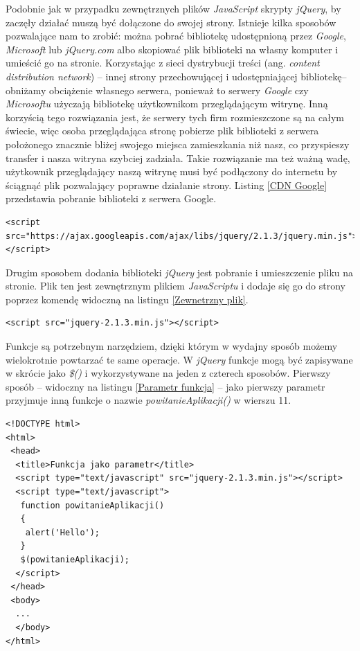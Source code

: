 \documentclass{iiuwb}
\begin{document}
Podobnie jak w przypadku zewnętrznych plików \textit{JavaScript} skrypty \textit{jQuery}, by zaczęły działać muszą być dołączone do swojej strony. Istnieje kilka sposobów pozwalające nam to zrobić: można pobrać bibliotekę udostępnioną przez \textit{Google}, \textit{Microsoft} lub \textit{jQuery.com} albo skopiować plik biblioteki na własny komputer i umieścić go na stronie.
Korzystając z sieci dystrybucji treści (ang. \textit{content distribution network}) -- innej strony przechowującej i udostępniającej bibliotekę--obniżamy obciążenie własnego serwera, ponieważ to serwery \textit{Google} czy \textit{Microsoftu} użyczają bibliotekę użytkownikom przeglądającym witrynę. Inną korzyścią tego rozwiązania jest, że serwery tych firm rozmieszczone są na całym świecie, więc osoba przeglądająca stronę pobierze plik biblioteki z serwera położonego znacznie bliżej swojego miejsca zamieszkania niż nasz, co przyspieszy transfer i nasza witryna szybciej zadziała. Takie rozwiązanie ma też ważną wadę, użytkownik przeglądający naszą witrynę musi być podłączony do internetu by ściągnąć plik pozwalający poprawne działanie strony. Listing  \ref{CDN Google} przedstawia pobranie biblioteki z serwera Google.

\begin{lstlisting}[label=CDN Google, caption=Pobranie biblioteki z serwera Google]
<script src="https://ajax.googleapis.com/ajax/libs/jquery/2.1.3/jquery.min.js"></script>
\end{lstlisting}

Drugim sposobem dodania biblioteki \textit{jQuery} jest pobranie i umieszczenie pliku na stronie. Plik ten jest zewnętrznym plikiem \textit{JavaScriptu} i dodaje się go do strony poprzez komendę widoczną na listingu \ref{Zewnetrzny plik}.
\begin{lstlisting}[label=Zewnetrzny plik, caption=Dodanie zewnętrznego pliku jQuery]
<script src="jquery-2.1.3.min.js"></script>
\end{lstlisting}

Funkcje są potrzebnym narzędziem, dzięki którym w wydajny sposób możemy wielokrotnie powtarzać te same operacje. W \textit{jQuery} funkcje mogą być zapisywane w skrócie jako \textit{\$()} i wykorzystywane na jeden z czterech sposobów. Pierwszy sposób -- widoczny na listingu \ref{Parametr funkcja} -- jako pierwszy parametr przyjmuje inną funkcje o nazwie \textit{powitanieAplikacji()} w wierszu 11.

\begin{lstlisting}[label=Parametr funkcja, caption=Wywołanie funkcji przyjmującej inną funkcje jako parametr]
<!DOCTYPE html>
<html>
 <head>
  <title>Funkcja jako parametr</title>
  <script type="text/javascript" src="jquery-2.1.3.min.js"></script>
  <script type="text/javascript">
   function powitanieAplikacji()
   {
   	alert('Hello');
   }
   $(powitanieAplikacji);
  </script>
 </head>
 <body>
  ...
  </body>
</html>
\end{lstlisting}
\end{document}
